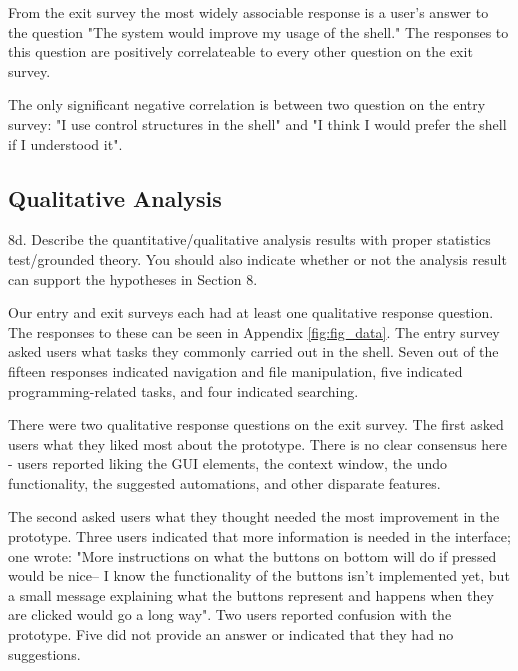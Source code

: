 From the exit survey the most widely associable response is a user's answer to
the question "The system would improve my usage of the shell." The responses to
this question are positively correlateable to every other question on the exit
survey.

The only significant negative correlation is between two question on the entry
survey: "I use control structures in the shell" and "I think I would prefer the
shell if I understood it".

\subsection{Qualitative Analysis}
    8d. Describe the quantitative/qualitative analysis results with proper
    statistics test/grounded theory. You should also indicate whether or not the
    analysis result can support the hypotheses in Section 8.

Our entry and exit surveys each had at least one qualitative response question.
The responses to these can be seen in Appendix \ref{fig:fig_data}.
The entry survey asked users what tasks they commonly carried out in the shell.
Seven out of the fifteen responses indicated navigation and file manipulation,
five indicated programming-related tasks, and four indicated searching.

There were two qualitative response questions on the exit survey. The first
asked users what they liked most about the prototype. There is no clear
consensus here - users reported liking the GUI elements, the context window, the
undo functionality, the suggested automations, and other disparate features.

The second asked users what they thought needed the most improvement in the
prototype. Three users indicated that more information is needed in the
interface; one wrote: "More instructions on what the buttons on bottom will do
if pressed would be nice-- I know the functionality of the buttons isn't
implemented yet, but a small message explaining what the buttons represent and
happens when they are clicked would go a long way". Two users reported confusion
with the prototype. Five did not provide an answer or indicated that they had no
suggestions.

